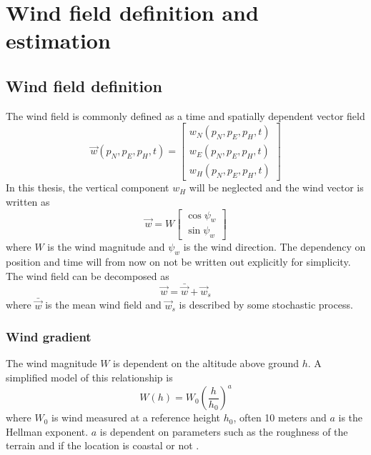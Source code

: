 \chapter{Wind field definition and estimation}\label{cha:wind}
\section{Wind field definition}
The wind field is commonly defined as a time and spatially dependent vector field
\begin{equation}
    \vec{w}(p_N,p_E,p_H,t)=
    \begin{bmatrix}
        w_N(p_N,p_E,p_H,t) \\
        w_E(p_N,p_E,p_H,t) \\
        w_H(p_N,p_E,p_H,t)
    \end{bmatrix}
\end{equation}
In this thesis, the vertical component $w_H$ will be neglected and the wind vector is written as 
\begin{equation}
    \vec{w}=W\begin{bmatrix}
        \cos\psi_w\\
        \sin\psi_w
    \end{bmatrix}
\end{equation}
where $W$ is the wind magnitude and $\psi_w$ is the wind direction. The dependency on position and time will from now on not be written out explicitly for simplicity.
The wind field can be decomposed as
\begin{equation}
    \vec{w} = \bar{\vec{w}} + \vec{w}_s
\end{equation}
where $\bar{\vec{w}}$ is the mean wind field and $\vec{w}_s$ is described by some stochastic process.

\subsection{Wind gradient}
The wind magnitude $W$ is dependent on the altitude above ground $h$. A simplified model of this relationship is 
\begin{equation}
    W(h)=W_{0}\left(\frac{h}{h_0}\right)^a
\end{equation}
where $W_{0}$ is wind measured at a reference height $h_0$, often 10 meters and $a$ is the Hellman exponent. $a$ is dependent on parameters such as the 
roughness of the terrain and if the location is coastal or not \cite{wind_hellman}.
